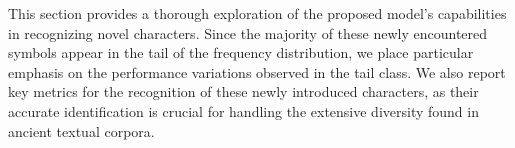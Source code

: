%


This section provides a thorough exploration of the proposed model’s capabilities in recognizing novel characters. Since the majority of these newly encountered symbols appear in the tail of the frequency distribution, we place particular emphasis on the performance variations observed in the tail class. We also report key metrics for the recognition of these newly introduced characters, as their accurate identification is crucial for handling the extensive diversity found in ancient textual corpora.

